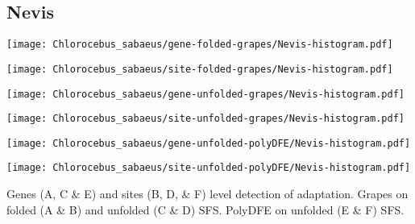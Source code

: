 \documentclass{article}
\begin{document}
\subsection{Nevis}
\centering
\begin{minipage}{0.49\linewidth}
    \texttt{[image: Chlorocebus\_sabaeus/gene-folded-grapes/Nevis-histogram.pdf]}
\end{minipage}%
\hfill
\begin{minipage}{0.49\linewidth}
    \texttt{[image: Chlorocebus\_sabaeus/site-folded-grapes/Nevis-histogram.pdf]}
\end{minipage}
\hfill
\begin{minipage}{0.49\linewidth}
    \texttt{[image: Chlorocebus\_sabaeus/gene-unfolded-grapes/Nevis-histogram.pdf]}
\end{minipage}%
\hfill
\begin{minipage}{0.49\linewidth}
    \texttt{[image: Chlorocebus\_sabaeus/site-unfolded-grapes/Nevis-histogram.pdf]}
\end{minipage}
\hfill
\begin{minipage}{0.49\linewidth}
    \texttt{[image: Chlorocebus\_sabaeus/gene-unfolded-polyDFE/Nevis-histogram.pdf]}
\end{minipage}%
\hfill
\begin{minipage}{0.49\linewidth}
    \texttt{[image: Chlorocebus\_sabaeus/site-unfolded-polyDFE/Nevis-histogram.pdf]}
\end{minipage}
\hfill
\flushleft
Genes (A, C \& E) and sites (B, D, \& F) level detection of adaptation.
Grapes on folded (A \& B) and unfolded (C \& D) SFS.
PolyDFE on unfolded (E \& F) SFS.

\pagebreak
\end{document}
